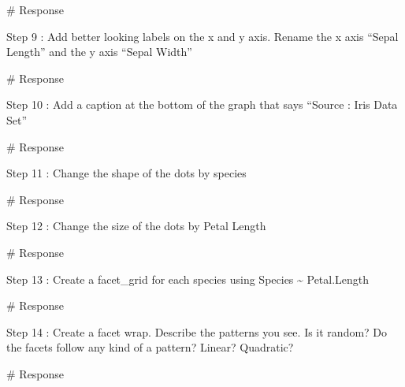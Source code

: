 \documentclass[
  letterpaper,
  DIV=11,
  numbers=noendperiod]{scrreprt}
\newenvironment{Shaded}{\begin{snugshade}}{\end{snugshade}}
\newcommand{\CommentTok}[1]{\textcolor[rgb]{0.37,0.37,0.37}{#1}}
\begin{document}
\begin{Shaded}
\begin{Highlighting}[]
\CommentTok{\# Response}
\end{Highlighting}
\end{Shaded}

Step 9 : Add better looking labels on the x and y axis. Rename the x
axis ``Sepal Length'' and the y axis ``Sepal Width''

\begin{Shaded}
\begin{Highlighting}[]
\CommentTok{\# Response}
\end{Highlighting}
\end{Shaded}

Step 10 : Add a caption at the bottom of the graph that says ``Source :
Iris Data Set''

\begin{Shaded}
\begin{Highlighting}[]
\CommentTok{\# Response}
\end{Highlighting}
\end{Shaded}

Step 11 : Change the shape of the dots by species

\begin{Shaded}
\begin{Highlighting}[]
\CommentTok{\# Response}
\end{Highlighting}
\end{Shaded}

Step 12 : Change the size of the dots by Petal Length

\begin{Shaded}
\begin{Highlighting}[]
\CommentTok{\# Response}
\end{Highlighting}
\end{Shaded}

Step 13 : Create a facet\_grid for each species using Species
\textasciitilde{} Petal.Length

\begin{Shaded}
\begin{Highlighting}[]
\CommentTok{\# Response}
\end{Highlighting}
\end{Shaded}

Step 14 : Create a facet wrap. Describe the patterns you see. Is it
random? Do the facets follow any kind of a pattern? Linear? Quadratic?

\begin{Shaded}
\begin{Highlighting}[]
\CommentTok{\# Response}
\end{Highlighting}
\end{Shaded}
\end{document}
